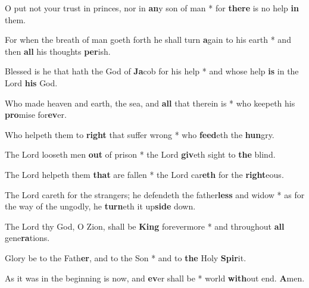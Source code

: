 \begin{multicols}{2}
	O put not your trust in princes, nor in \textbf{an}y son of man * for \textbf{there} is no help \textbf{in} them.
	
	For when the breath of man goeth forth he shall turn \textbf{a}gain to his earth * and then \textbf{all} his thoughts \textbf{per}ish.
	
	Blessed is he that hath the God of \textbf{Ja}cob for his help * and whose help \textbf{is} in the Lord \textbf{his} God.
	
	Who made heaven and earth, the sea, and \textbf{all} that therein is * who keepeth his \textbf{pro}mise for\textbf{ev}er.
	
	Who helpeth them to \textbf{right} that suffer wrong * who \textbf{feed}eth the \textbf{hun}gry.
	
	The Lord looseth men \textbf{out} of prison * the Lord \textbf{giv}eth sight to \textbf{the} blind.
	
	The Lord helpeth them \textbf{that} are fallen * the Lord car\textbf{eth} for the \textbf{right}eous.
	
	The Lord careth for the strangers; he defendeth the father\textbf{less} and widow * as for the way of the ungodly, he \textbf{turn}eth it up\textbf{side} down.
	
	The Lord thy God, O Zion, shall be \textbf{King} forevermore * and throughout \textbf{all} gene\textbf{ra}tions.
	
	Glory be to the Fath\textbf{er}, and to the Son * and to \textbf{the} Holy \textbf{Spir}it.
	
	As it was in the beginning is now, and \textbf{ev}er shall be * world \textbf{with}out end. \textbf{A}men.
\end{multicols}